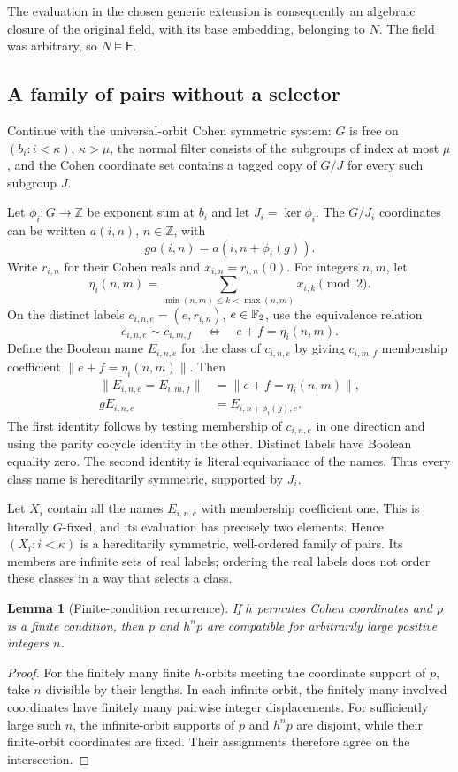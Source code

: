 \documentclass[11pt,a4paper]{article}
\newtheorem{lemma}[theorem]{Lemma}
\theoremstyle{definition}\newtheorem{definition}[theorem]{Definition}
\theoremstyle{remark}\newtheorem{remark}[theorem]{Remark}
\newcommand{\E}{\mathsf E}\newcommand{\U}{\mathsf U}
\begin{document}
The evaluation in the chosen generic extension is consequently an algebraic closure of the original field, with its base embedding, belonging to $N$. The field was arbitrary, so $N\models\E$.

\subsection{A family of pairs without a selector}\label{sec:boolean-pairs}
Continue with the universal-orbit Cohen symmetric system: $G$ is free on $(b_i:i<\kappa)$, $\kappa>\mu$, the normal filter consists of the subgroups of index at most $\mu$, and the Cohen coordinate set contains a tagged copy of $G/J$ for every such subgroup $J$.

Let $\phi_i:G\to\mathbb Z$ be exponent sum at $b_i$ and let $J_i=\ker\phi_i$. The $G/J_i$ coordinates can be written $a(i,n)$, $n\in\mathbb Z$, with
\[
g a(i,n)=a(i,n+\phi_i(g)).
\]
Write $r_{i,n}$ for their Cohen reals and $x_{i,n}=r_{i,n}(0)$. For integers $n,m$, let
\[
\eta_i(n,m)=\sum_{\min(n,m)\leq k<\max(n,m)}x_{i,k}\pmod2.
\]
On the distinct labels $c_{i,n,e}=(e,r_{i,n})$, $e\in\mathbb F_2$, use the equivalence relation
\[
c_{i,n,e}\sim c_{i,m,f}\quad\Longleftrightarrow\quad e+f=\eta_i(n,m).
\]
Define the Boolean name $E_{i,n,e}$ for the class of $c_{i,n,e}$ by giving $c_{i,m,f}$ membership coefficient $\lVert e+f=\eta_i(n,m)\rVert$. Then
\begin{align}
\lVert E_{i,n,e}=E_{i,m,f}\rVert
 &=\lVert e+f=\eta_i(n,m)\rVert,\label{eq:class-equality}\\
gE_{i,n,e}&=E_{i,n+\phi_i(g),e}.\label{eq:class-action}
\end{align}
The first identity follows by testing membership of $c_{i,n,e}$ in one direction and using the parity cocycle identity in the other. Distinct labels have Boolean equality zero. The second identity is literal equivariance of the names. Thus every class name is hereditarily symmetric, supported by $J_i$.

Let $X_i$ contain all the names $E_{i,n,e}$ with membership coefficient one. This is literally $G$-fixed, and its evaluation has precisely two elements. Hence $(X_i:i<\kappa)$ is a hereditarily symmetric, well-ordered family of pairs. Its members are infinite sets of real labels; ordering the real labels does not order these classes in a way that selects a class.

\begin{lemma}[Finite-condition recurrence]\label{lem:cohen-recurrence}
If $h$ permutes Cohen coordinates and $p$ is a finite condition, then $p$ and $h^np$ are compatible for arbitrarily large positive integers $n$.
\end{lemma}
\begin{proof}
For the finitely many finite $h$-orbits meeting the coordinate support of $p$, take $n$ divisible by their lengths. In each infinite orbit, the finitely many involved coordinates have finitely many pairwise integer displacements. For sufficiently large such $n$, the infinite-orbit supports of $p$ and $h^np$ are disjoint, while their finite-orbit coordinates are fixed. Their assignments therefore agree on the intersection.
\end{proof}
\end{document}
